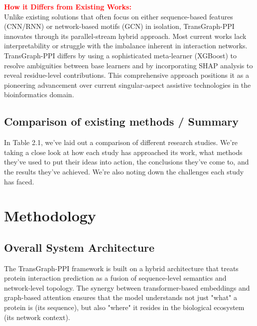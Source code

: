 \documentclass[12pt,a4paper]{report}
\begin{document}
\noindent
\textbf{\textcolor{red}{How it Differs from Existing Works:}} \\
Unlike existing solutions that often focus on either sequence-based features (CNN/RNN) or network-based motifs (GCN) in isolation, TransGraph-PPI innovates through its parallel-stream hybrid approach. Most current works lack interpretability or struggle with the imbalance inherent in interaction networks. TransGraph-PPI differs by using a sophisticated meta-learner (XGBoost) to resolve ambiguities between base learners and by incorporating SHAP analysis to reveal residue-level contributions. This comprehensive approach positions it as a pioneering advancement over current singular-aspect assistive technologies in the bioinformatics domain.

\section{Comparison of existing methods / Summary}
In Table 2.1, we've laid out a comparison of different research studies. We're taking a close look at how each study has approached its work, what methods they've used to put their ideas into action, the conclusions they've come to, and the results they've achieved. We're also noting down the challenges each study has faced.

\chapter{Methodology}
\section{Overall System Architecture}
The TransGraph-PPI framework is built on a hybrid architecture that treats protein interaction prediction as a fusion of sequence-level semantics and network-level topology. The synergy between transformer-based embeddings and graph-based attention ensures that the model understands not just "what" a protein is (its sequence), but also "where" it resides in the biological ecosystem (its network context).
\end{document}
